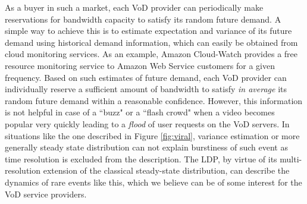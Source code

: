 \documentclass[twoside]{article}
\begin{document}
As a buyer in such a market, each VoD provider can periodically make reservations for bandwidth capacity to satisfy its random future demand. A simple way to achieve this is to estimate expectation and variance of its future demand using historical demand information, which can easily be obtained from cloud monitoring services. As an example, Amazon Cloud-Watch provides a free resource monitoring service to Amazon Web Service customers for a given frequency. Based on such estimates of future demand, each VoD provider can individually reserve a sufficient amount of bandwidth to satisfy {\it in average} its random future demand within a reasonable confidence. However, this information is not helpful in case of a ``buzz" or a ``flash crowd" when a video becomes popular very quickly leading to a \emph{flood} of user requests on the VoD servers.
In situations like the one described in Figure \ref{fig:viral}, variance estimation or more generally steady state distribution can not explain burstiness of such event as time resolution is excluded from the description. The LDP, by virtue of its multi-resolution extension of the classical steady-state distribution, can describe the dynamics of rare events like this, which we believe can be of some interest for the VoD service providers.
\end{document}
